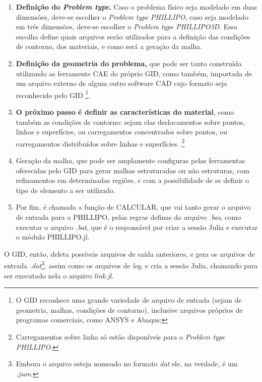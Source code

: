 \begin{enumerate}
    \item \textbf{Definição do \emph{Problem type}.} Caso o problema físico seja modelado em duas dimensões, deve-se escolher o \emph{Problem type} \emph{PHILLIPO}, caso seja modelado em três dimensões, deve-se escolher o \emph{Problem type} \emph{PHILLIPO3D}. Essa escolha define quais arquivos serão utilizados para a definição das condições de contorno, dos materiais, e como será a geração da malha.

    \item \textbf{Definição da geometria do problema,} que pode ser tanto construída utilizando as ferramente CAE do próprio GID, como também, importada de um arquivo externo de algum outro software CAD cujo formato seja reconhecido pelo GID \footnote{O GID reconhece uma grande variedade de arquivo de entrada (sejam de geometria, malhas, condições de contorno), inclusive arquivos próprios de programas comerciais, como ANSYS e Abaqus;}.

    \item \textbf{O próximo passo é definir as características do material}, como também as condições de contorno: sejam elas deslocamentos sobre pontos, linhas e superfícies, ou carregamentos concentrados sobre pontos, ou carregamentos distribuídos sobre linhas e superfícies. \footnote{Carregamentos sobre linha só estão disponíveis para o \emph{Problem type} \emph{PHILLIPO}.}

    \item Geração da malha, que pode ser amplamente configuras pelas ferramentas oferecidas pelo GID para gerar malhas estruturadas ou não estruturas, com refinamentos em determinadas regiões, e com a possibilidade de se definir o tipo de elemento a ser utilizado. 
    \item Por fim, é chamada a função de CALCULAR, que vai tanto gerar o arquivo de entrada para o PHILLIPO, pelas regras definas do arquivo \emph{.bas}, como executar o arquivo \emph{.bat}, que é o responsável por criar a sessão Julia e executar o módulo PHILLIPO.jl. 
\end{enumerate}

O GID, então, deleta possíveis arquivos de saída anteriores, e gera os arquivos de entrada \emph{.dat}\footnote{Embora o arquivo esteja nomeado no formato \emph{dat} ele, na verdade, é um \emph{.json}.}, assim como os arquivos de \emph{log}, e cria a sessão Julia, chamando para ser executado nela o arquivo \emph{link.jl}.

